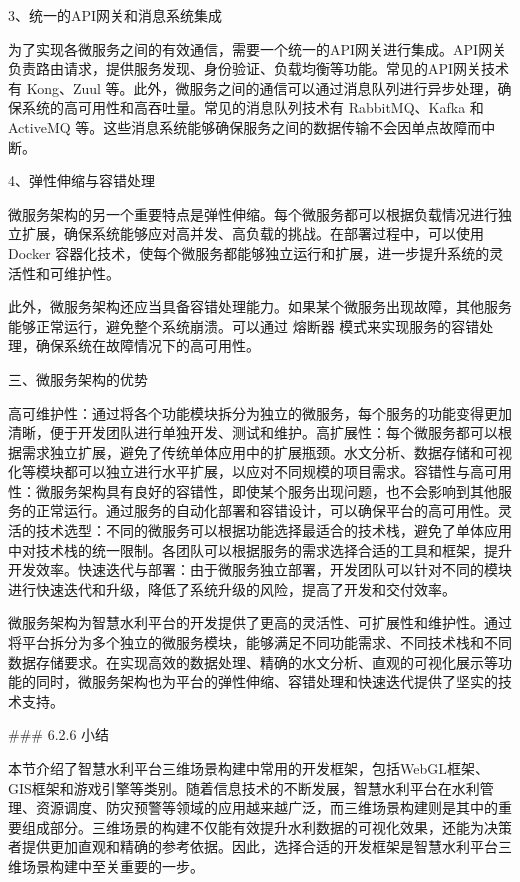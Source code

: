 3、统一的API网关和消息系统集成

为了实现各微服务之间的有效通信，需要一个统一的API网关进行集成。API网关负责路由请求，提供服务发现、身份验证、负载均衡等功能。常见的API网关技术有 Kong、Zuul 等。此外，微服务之间的通信可以通过消息队列进行异步处理，确保系统的高可用性和高吞吐量。常见的消息队列技术有 RabbitMQ、Kafka 和 ActiveMQ 等。这些消息系统能够确保服务之间的数据传输不会因单点故障而中断。

4、弹性伸缩与容错处理

微服务架构的另一个重要特点是弹性伸缩。每个微服务都可以根据负载情况进行独立扩展，确保系统能够应对高并发、高负载的挑战。在部署过程中，可以使用 Docker 容器化技术，使每个微服务都能够独立运行和扩展，进一步提升系统的灵活性和可维护性。

此外，微服务架构还应当具备容错处理能力。如果某个微服务出现故障，其他服务能够正常运行，避免整个系统崩溃。可以通过 熔断器 模式来实现服务的容错处理，确保系统在故障情况下的高可用性。

三、微服务架构的优势

高可维护性：通过将各个功能模块拆分为独立的微服务，每个服务的功能变得更加清晰，便于开发团队进行单独开发、测试和维护。高扩展性：每个微服务都可以根据需求独立扩展，避免了传统单体应用中的扩展瓶颈。水文分析、数据存储和可视化等模块都可以独立进行水平扩展，以应对不同规模的项目需求。容错性与高可用性：微服务架构具有良好的容错性，即使某个服务出现问题，也不会影响到其他服务的正常运行。通过服务的自动化部署和容错设计，可以确保平台的高可用性。灵活的技术选型：不同的微服务可以根据功能选择最适合的技术栈，避免了单体应用中对技术栈的统一限制。各团队可以根据服务的需求选择合适的工具和框架，提升开发效率。快速迭代与部署：由于微服务独立部署，开发团队可以针对不同的模块进行快速迭代和升级，降低了系统升级的风险，提高了开发和交付效率。

微服务架构为智慧水利平台的开发提供了更高的灵活性、可扩展性和维护性。通过将平台拆分为多个独立的微服务模块，能够满足不同功能需求、不同技术栈和不同数据存储要求。在实现高效的数据处理、精确的水文分析、直观的可视化展示等功能的同时，微服务架构也为平台的弹性伸缩、容错处理和快速迭代提供了坚实的技术支持。

\#\#\# 6.2.6 小结

本节介绍了智慧水利平台三维场景构建中常用的开发框架，包括WebGL框架、GIS框架和游戏引擎等类别。随着信息技术的不断发展，智慧水利平台在水利管理、资源调度、防灾预警等领域的应用越来越广泛，而三维场景构建则是其中的重要组成部分。三维场景的构建不仅能有效提升水利数据的可视化效果，还能为决策者提供更加直观和精确的参考依据。因此，选择合适的开发框架是智慧水利平台三维场景构建中至关重要的一步。

